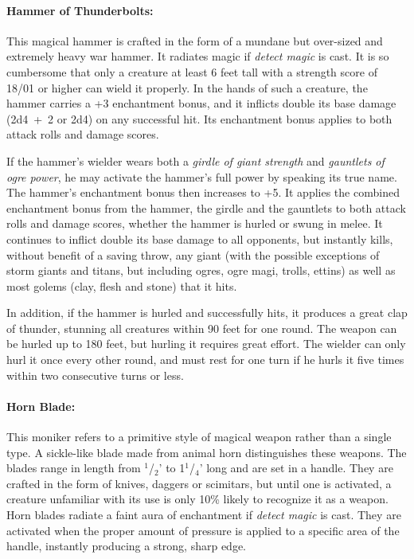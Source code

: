 \begin{multicols}{2}
\paragraph{Hammer of Thunderbolts:} This magical hammer is crafted in the form of a mundane but over-sized and extremely heavy war hammer.  It radiates magic if \textit{detect magic} is cast.  It is so cumbersome that only a creature at least 6 feet tall with a strength score of 18/01 or higher can wield it properly.  In the hands of such a creature, the hammer carries a +3 enchantment bonus, and it inflicts double its base damage (2d4~+~2 or 2d4) on any successful hit.  Its enchantment bonus applies to both attack rolls and damage scores.  

If the hammer's wielder wears both a \textit{girdle of giant strength} and \textit{gauntlets of ogre power}, he may activate the hammer's full power by speaking its true name.  The hammer's enchantment bonus then increases to +5.  It applies the combined enchantment bonus from the hammer, the girdle and the gauntlets to both attack rolls and damage scores, whether the hammer is hurled or swung in melee.  It continues to inflict double its base damage to all opponents, but instantly kills, without benefit of a saving throw, any giant (with the possible exceptions of storm giants and titans, but including ogres, ogre magi, trolls, ettins) as well as most golems (clay, flesh and stone) that it hits.  

In addition, if the hammer is hurled and successfully hits, it produces a great clap of thunder, stunning all creatures within 90 feet for one round.  The weapon can be hurled up to 180 feet, but hurling it requires great effort.  The wielder can only hurl it once every other round, and must rest for one turn if he hurls it five times within two consecutive turns or less.

\paragraph{Horn Blade:} This moniker refers to a primitive style of magical weapon rather than a single type.  A sickle-like blade made from animal horn distinguishes these weapons.  The blades range in length from $^1$/$_2$' to 1$^1$/$_4$' long and are set in a handle.  They are crafted in the form of knives, daggers or scimitars, but until one is activated, a creature unfamiliar with its use is only 10\% likely to recognize it as a weapon.  Horn blades radiate a faint aura of enchantment if \textit{detect magic} is cast.  They are activated when the proper amount of pressure is applied to a specific area of the handle, instantly producing a strong, sharp edge.  


\end{multicols}
